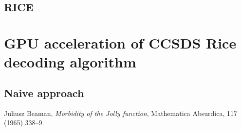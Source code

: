 \documentclass[licencjacka,en]{pracamgr}
\begin{document}
\section{RICE}

\chapter{GPU acceleration of CCSDS Rice decoding algorithm}\label{r:losers}

\section{Naive approach}







\begin{thebibliography}{99}

 Juliusz Beaman, \textit{Morbidity of the Jolly
    function}, Mathematica Absurdica, 117 (1965) 338--9.


\end{thebibliography}
\end{document}

